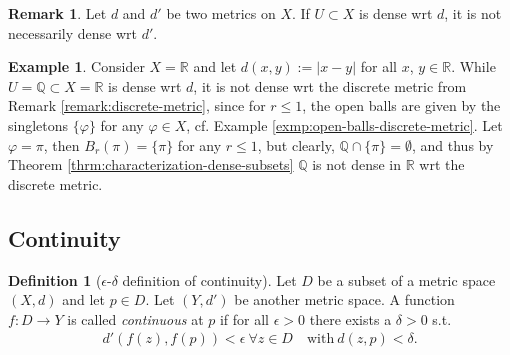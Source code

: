 \documentclass[12pt, a4paper]{article}
\numberwithin{equation}{section}
\theoremstyle{definition}
\theoremstyle{definition}
\newtheorem{defn}[thm]{Definition} %
\newtheorem{exmp}[thm]{Example} %
\newtheorem{remark}[thm]{Remark} %
\newcommand{\abs}[1]{\left\vert #1 \right\vert}
\begin{document}
	\begin{remark}
		Let $d$ and $d'$ be two metrics on $X$. If $U\subset X$ is dense wrt $d$, it is not necessarily dense wrt $d'$.
	\end{remark}

	\begin{exmp}
		Consider $X=\mathbb R$ and let $d(x, y) := \abs{x - y}$ for all $x$, $y\in\mathbb R$. While $U = \mathbb Q \subset X = \mathbb R$ is dense wrt $d$, it is not dense wrt the discrete metric from Remark \ref{remark:discrete-metric}, since for $r \leq 1$, the open balls are given by the singletons $\{\varphi\}$ for any $\varphi\in X$, cf. Example \ref{exmp:open-balls-discrete-metric}. Let $\varphi = \pi$, then $B_{r}(\pi) = \{\pi\}$ for any $r\leq 1$, but clearly, $\mathbb Q \cap \{\pi\} = \emptyset$, and thus by Theorem \ref{thrm:characterization-dense-subsets} $\mathbb Q$ is not dense in $\mathbb R$ wrt the discrete metric.
	\end{exmp}

	
	
	\newpage 
	\subsection{Continuity}
	\begin{defn}[$\epsilon$-$\delta$ definition of continuity]\label{defn:continuity}
		Let $D$ be a subset of a metric space $(X, d)$ and let $p\in D$. Let $(Y, d')$ be another metric space. A function $f: D\rightarrow Y$ is called \textit{continuous} at $p$ if for all $\epsilon > 0$ there exists a $\delta > 0$ s.t. 
		\begin{align}
			d'\left( f\left(z\right), f\left(p\right) \right) < \epsilon \ \forall z\in D \quad \text{with} \ d\left(z, p\right) < \delta.  
		\end{align}
		 \cite{MfPI}
	\end{defn}
\end{document}
